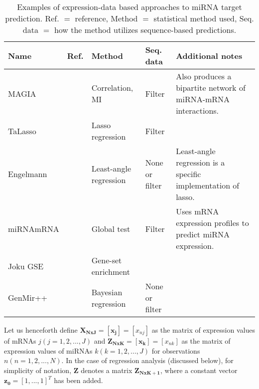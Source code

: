 \begin{table}
  \caption{Examples of expression-data based approaches to miRNA target prediction.
  Ref. $=$ reference, Method $=$ statistical method used, Seq. data $=$ how the method utilizes sequence-based predictions.}
  \label{table:expression-methods}
  \centering
  \begingroup\small
  \begin{tabular}{ llllp{4cm} }
    \\[-1ex] \hline\hline
    \textbf{Name} & \textbf{Ref.} & \textbf{Method} & \textbf{Seq. data} & \textbf{Additional notes} \\
    \hline
    MAGIA     & \citep{Sales2010}      & Correlation, MI        & Filter & Also produces a bipartite network of miRNA-mRNA interactions. \\
    TaLasso   & \citep{Muniategui2013} & Lasso regression       & Filter &  \\
    Engelmann & \citep{Engelmann2012}  & Least-angle regression & None or filter & Least-angle regression is a specific implementation of lasso. \\
    miRNAmRNA & \citep{vanIterson2013} & Global test & Filter   & Uses mRNA expression profiles to predict miRNA expression. \\
    Joku GSE  &                        & Gene-set enrichment    & \\
    GenMir++  & \citep{Huang2007}      & Bayesian regression    & None or filter & \\
    \hline\hline
    \end{tabular}
    \endgroup
\end{table}

Let us henceforth define $\mathbf{X_{NxJ}} = [\mathbf{x_j}] = [x_{nj}]$ as the
matrix of expression values of mRNAs $j (j = 1, 2, ..., J)$ and
$\mathbf{Z_{NxK}} = [\mathbf{x_k}] = [x_{nk}]$ as the matrix of expression
values of miRNAs $k (k = 1, 2, ..., J)$ for observations $n (n = 1, 2, ...,
N)$. In the case of regression analysis (discussed below), for simplicity of
notation, $\mathbf{Z}$ denotes a matrix $\mathbf{Z_{NxK+1}}$, where a constant
vector $\mathbf{z_0} = [1, ..., 1]^T$ has been added.

